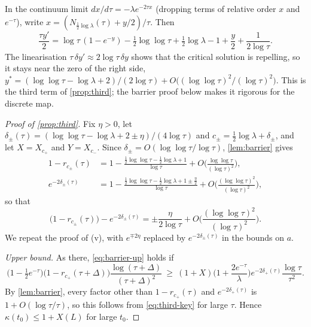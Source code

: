 \begin{remark}\label{rem:third-heuristic}
In the continuum limit $dx/d\tau=-\lambda e^{-2\tau x}$ (dropping terms of relative order $x$ and $e^{-\tau}$), write
$x=(N_{\frac12\log\lambda}(\tau)+y/2)/\tau$. Then
\[
\frac{\tau y'}{2}=\log\tau\,(1-e^{-y})-\tfrac12\log\log\tau+\tfrac12\log\lambda-1+\frac y2+\frac1{2\log\tau}.
\]
The linearisation $\tau\,\delta y'\approx2\log\tau\,\delta y$ shows that the critical solution is repelling, so it stays near the zero of the right
side, $y^*=(\log\log\tau-\log\lambda+2)/(2\log\tau)+O\big((\log\log\tau)^2/(\log\tau)^2\big)$. This is the third term of \cref{prop:third};
the barrier proof below makes it rigorous for the discrete map.
\end{remark}

\begin{proof}[Proof of \cref{prop:third}]
Fix $\eta>0$, let $\delta_\pm(\tau)=(\log\log\tau-\log\lambda+2\pm\eta)/(4\log\tau)$ and $c_\pm=\frac12\log\lambda+\delta_\pm$, and let
$X=X_{c_+}$ and $Y=X_{c_-}$. Since $\delta_\pm=O(\log\log\tau/\log\tau)$, \cref{lem:barrier} gives
\begin{align*}
1-r_{c_\pm}(\tau)&=1-\frac{\frac12\log\log\tau-\frac12\log\lambda+1}{\log\tau}+O\Big(\frac{\log\log\tau}{(\log\tau)^2}\Big),\\
e^{-2\delta_\pm(\tau)}&=1-\frac{\frac12\log\log\tau-\frac12\log\lambda+1\pm\frac\eta2}{\log\tau}+O\Big(\frac{(\log\log\tau)^2}{(\log\tau)^2}\Big),
\end{align*}
so that
\begin{equation}\label{eq:third-key}
\big(1-r_{c_\pm}(\tau)\big)-e^{-2\delta_\pm(\tau)}=\pm\frac{\eta}{2\log\tau}+O\Big(\frac{(\log\log\tau)^2}{(\log\tau)^2}\Big).
\end{equation}
We repeat the proof of (v), with $e^{\mp2\eta}$ replaced by $e^{-2\delta_\pm(\tau)}$ in the bounds on $a$.

\emph{Upper bound.} As there, \eqref{eq:barrier-up} holds if
\[
\big(1-\tfrac12e^{-\tau}\big)\big(1-r_{c_+}(\tau+\Delta)\big)\frac{\log(\tau+\Delta)}{(\tau+\Delta)^2}\ \ge\
(1+X)\Big(1+\frac{2e^{-\tau}}{\lambda}\Big)e^{-2\delta_+(\tau)}\frac{\log\tau}{\tau^2}.
\]
By \cref{lem:barrier}, every factor other than $1-r_{c_+}(\tau)$ and $e^{-2\delta_+(\tau)}$ is $1+O(\log\tau/\tau)$, so this follows from
\eqref{eq:third-key} for large $\tau$. Hence $\kappa(t_0)\le1+X(L)$ for large $t_0$.


\end{proof}
